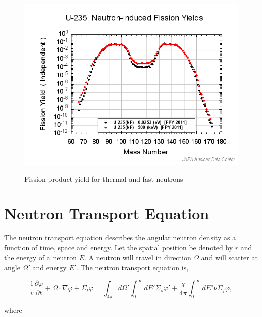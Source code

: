 \begin{figure}[t]
  \centering
  \includegraphics[width=5.5in]{images/chapter-2/fissionYield.png}\\
  \caption{Fission product yield for thermal and fast neutrons}
  \label{fig:fissionYield}
\end{figure} 


\section{Neutron Transport Equation}
The neutron transport equation describes the angular neutron density as a function of time, space and energy. Let the spatial position be denoted by $r$ and the energy of a neutron $E$. A neutron will travel in direction $\Omega$ and will scatter at angle $\Omega'$ and energy $E'$.  The neutron transport equation is,

\begin{equation}
    \frac{1}{v}\frac{\partial \varphi}{\partial t} + \Omega \cdot \nabla \varphi + \Sigma_{t}\varphi = \int_{4\pi} d\Omega'\int_{0}^{\infty}dE'\Sigma_{s}\varphi' + \frac{\chi}{4\pi}\int_{0}^{\infty}dE'\nu\Sigma_{f}\varphi,
    \label{eq:angularNeutronTransport}
\end{equation}

\noindent where 

